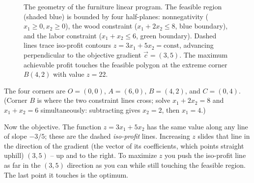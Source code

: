 \begin{figure}[H]
\caption{The geometry of the furniture linear program. The feasible region
(shaded blue) is bounded by four half-planes: nonnegativity ($x_1 \ge 0, x_2 \ge 0$),
the wood constraint ($x_1 + 2x_2 \le 8$, blue boundary), and the labor constraint
($x_1 + x_2 \le 6$, green boundary). Dashed lines trace iso-profit contours
$z = 3x_1 + 5x_2 = \text{const}$, advancing perpendicular to the objective gradient
$\vec{c} = (3,5)$. The maximum achievable profit touches the feasible polygon at the
extreme corner $B(4,2)$ with value $z = 22$.}
\label{ch28:fig-polytope}
\end{figure}

The four corners are $O=(0,0)$, $A=(6,0)$, $B=(4,2)$, and $C=(0,4)$. (Corner
$B$ is where the two constraint lines cross; solve $x_1+2x_2=8$ and
$x_1+x_2=6$ simultaneously: subtracting gives $x_2 = 2$, then $x_1 = 4$.)

Now the objective. The function $z = 3x_1 + 5x_2$ has the same value along any
line of slope $-3/5$; these are the dashed \emph{iso-profit} lines. Increasing
$z$ slides that line in the direction of the gradient (the vector of its coefficients, which points straight uphill) $(3,5)$ -- up and to the
right. To maximize $z$ you push the iso-profit line as far in the $(3,5)$
direction as you can while still touching the feasible region. The last point
it touches is the optimum.

